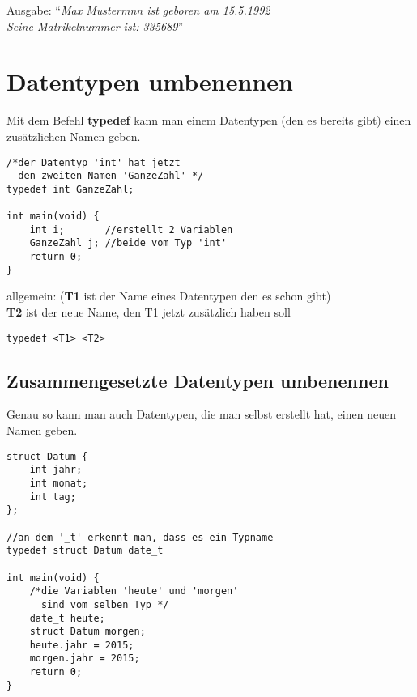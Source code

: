 \documentclass[c_worksheet.tex]{subfiles}
\begin{document}
\begin{tabbing}
Ausgabe: ``\=\textit{Max Mustermnn ist geboren am 15.5.1992}\\
           \>\textit{Seine Matrikelnummer ist: 335689}''
\end{tabbing}

\section{Datentypen umbenennen}

Mit dem Befehl \textbf{typedef} kann man einem Datentypen (den es bereits gibt) einen zusätzlichen Namen geben.

\begin{lstlisting}
/*der Datentyp 'int' hat jetzt
  den zweiten Namen 'GanzeZahl' */
typedef int GanzeZahl;

int main(void) {
    int i;       //erstellt 2 Variablen
    GanzeZahl j; //beide vom Typ 'int'
    return 0;
}
\end{lstlisting}

\begin{tabbing}
allgemein: (\=\textbf{T1} ist der Name eines Datentypen den es schon gibt)\\
            \>\textbf{T2} ist der neue Name, den T1 jetzt zusätzlich haben soll
\end{tabbing}
\begin{lstlisting}[numbers=none]
typedef <T1> <T2>
\end{lstlisting}

\subsection{Zusammengesetzte Datentypen umbenennen}

Genau so kann man auch Datentypen, die man selbst erstellt hat, einen neuen Namen geben.

\begin{lstlisting}
struct Datum {
    int jahr;
    int monat;
    int tag;
};

//an dem '_t' erkennt man, dass es ein Typname
typedef struct Datum date_t

int main(void) {
    /*die Variablen 'heute' und 'morgen'
      sind vom selben Typ */
    date_t heute;
    struct Datum morgen;
    heute.jahr = 2015;
    morgen.jahr = 2015;
    return 0;
}
\end{lstlisting}
\end{document}
